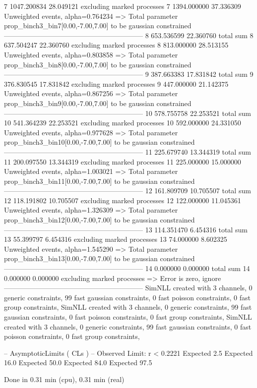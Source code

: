 7          1047.200834     28.049121       excluding marked processes    
7          1394.000000     37.336309       Unweighted events, alpha=0.764234
  => Total parameter prop_binch3_bin7[0.00,-7.00,7.00] to be gaussian constrained
------------------------------------------------------------
8          653.536599      22.360760       total sum                     
8          637.504247      22.360760       excluding marked processes    
8          813.000000      28.513155       Unweighted events, alpha=0.803858
  => Total parameter prop_binch3_bin8[0.00,-7.00,7.00] to be gaussian constrained
------------------------------------------------------------
9          387.663383      17.831842       total sum                     
9          376.830545      17.831842       excluding marked processes    
9          447.000000      21.142375       Unweighted events, alpha=0.867256
  => Total parameter prop_binch3_bin9[0.00,-7.00,7.00] to be gaussian constrained
------------------------------------------------------------
10         578.755758      22.253521       total sum                     
10         541.364239      22.253521       excluding marked processes    
10         592.000000      24.331050       Unweighted events, alpha=0.977628
  => Total parameter prop_binch3_bin10[0.00,-7.00,7.00] to be gaussian constrained
------------------------------------------------------------
11         225.679740      13.344319       total sum                     
11         200.097550      13.344319       excluding marked processes    
11         225.000000      15.000000       Unweighted events, alpha=1.003021
  => Total parameter prop_binch3_bin11[0.00,-7.00,7.00] to be gaussian constrained
------------------------------------------------------------
12         161.809709      10.705507       total sum                     
12         118.191802      10.705507       excluding marked processes    
12         122.000000      11.045361       Unweighted events, alpha=1.326309
  => Total parameter prop_binch3_bin12[0.00,-7.00,7.00] to be gaussian constrained
------------------------------------------------------------
13         114.351470      6.454316        total sum                     
13         55.399797       6.454316        excluding marked processes    
13         74.000000       8.602325        Unweighted events, alpha=1.545290
  => Total parameter prop_binch3_bin13[0.00,-7.00,7.00] to be gaussian constrained
------------------------------------------------------------
14         0.000000        0.000000        total sum                     
14         0.000000        0.000000        excluding marked processes    
  => Error is zero, ignore      
------------------------------------------------------------
SimNLL created with 3 channels, 0 generic constraints, 99 fast gaussian constraints, 0 fast poisson constraints, 0 fast group constraints, 
SimNLL created with 3 channels, 0 generic constraints, 99 fast gaussian constraints, 0 fast poisson constraints, 0 fast group constraints, 
SimNLL created with 3 channels, 0 generic constraints, 99 fast gaussian constraints, 0 fast poisson constraints, 0 fast group constraints, 

 -- AsymptoticLimits ( CLs ) --
Observed Limit: r < 0.2221
Expected  2.5%
Expected 16.0%
Expected 50.0%
Expected 84.0%
Expected 97.5%

Done in 0.31 min (cpu), 0.31 min (real)

